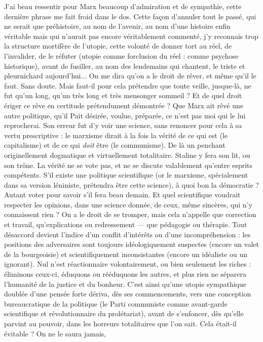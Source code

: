 J'ai beau ressentir pour Marx beaucoup d’admiration et de sympathie, cette
dernière phrase me fait froid dans le dos. Cette façon d’annuler tout le passé,
qui ne serait que préhistoire, au nom de l’avenir, au nom d’une histoire enfin
véritable mais qui n’aurait pas encore véritablement commenté, j'y reconnais
trop la structure mortifère de l’utopie, cette volonté de donner tort au réel, de
l’invalider, de le réfuter (utopie comme forclusion du réel : comme psychose
historique), avant de fusiller, au nom des lendemains qui chantent, le triste et
pleurnichard aujourd’hui... On me dira qu’on a le droit de rêver, et même
qu’il le faut. Sans doute. Mais faut-il pour cela prétendre que toute veille,
jusque-là, ne fut qu’un long, qu’un très long et très mensonger sommeil ? Et de
quel droit ériger ce rêve en certitude prétendument démontrée ? Que Marx ait
rêvé une autre politique, qu’il Pait désirée, voulue, préparée, ce n’est pas moi
qui le lui reprocherai. Son erreur fut d’y voir une science, sans renoncer pour
cela à sa vertu prescriptive : le marxisme dirait à la fois la vérité de ce qui est (le
capitalisme) et de ce qui {\it doit} être (le communisme). De là un penchant originellement
dogmatique et virtuellement totalitaire. Staline y fera son lit, ou son
trône. La vérité ne se vote pas, et ne se discute valablement qu'entre esprits
compétents. S’il existe une politique scientifique (or le marxisme, spécialement
dans sa version léniniste, prétendra être cette science), à quoi bon la
démocratie ? Autant voter pour savoir s’il fera beau demain. Et quel scientifique
voudrait respecter les opinions, dans une science donnée, de ceux, même
sincères, qui n’y connaissent rien ? On a le droit de se tromper, mais cela
n’appelle que correction et travail, qu’explications ou redressement — que pédagogie
ou thérapie. Tout désaccord devient l’indice d’un conflit d’intérêts ou
d’une incompréhension : les positions des adversaires sont toujours idéologiquement
suspectes (encore un valet de la bourgeoisie) et scientifiquement
inconsistantes (encore un idéaliste ou un ignorant). Nul n’est réactionnaire
volontairement, ou bien seulement les riches : éliminons ceux-ci, éduquons ou
rééduquons les autres, et plus rien ne séparera l’humanité de la justice et du
bonheur. C’est ainsi qu’une utopie sympathique doublée d’une pensée forte
dériva, dès ses commencements, vers une conception bureaucratique de la politique
(le Parti communiste comme avant-garde scientifique et révolutionnaire
du prolétariat), avant de s’enfoncer, dès qu’elle parvint au pouvoir, dans les
horreurs totalitaires que l’on sait. Cela était-il évitable ? On ne le saura jamais,
